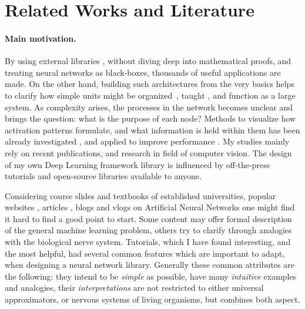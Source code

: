 \clearpage
\section{Related Works and Literature}

\paragraph{Main motivation.} By using external libraries \cite{TF, torch, caffe}, without diving deep into mathematical proofs, and treating neural networks as black-boxes, thousands of useful applications \cite{haykin2004comprehensive} are made. 
On the other hand, building such architectures from the very basics helps to clarify how simple units might be organized~\cite{milo2002network}, taught \cite{werbos1994roots}, and function \cite{hornik1989multilayer} as a large system. 
As complexity arises, the processes in the network becomes unclear and brings the question: what is the purpose of each node? 
Methods to visualize how activation patterns formulate, and what information is held within them has been already investigated \cite{yosinski2015understanding}, and applied to improve performance \cite{zeiler2014visualizing}. 
My studies mainly rely on recent publications, and research in field of computer vision. The design of my own Deep Learning framework library is influenced by off-the-press tutorials \cite{Goodfellow-et-al-2016-Book, deeplearningdotnet, nnsdl, stanfordlectures, gibiansky} and open-source libraries \cite{TF, torch, caffe} available to anyone.

Considering course slides \cite{stanfordlectures, oxfordlectures} and textbooks \cite{Goodfellow-et-al-2016-Book, werbos1994roots, bengio2009learning} of established universities, popular websites \cite{deeplearningdotnet, pedregosa2011scikit}, 
articles \cite{lecun2015deep}, blogs \cite{gibiansky, karpathyblog} and vlogs \cite{vlog1} on Artificial Neural Networks one might find it hard to find a good point to start. 
Some content may offer formal description of the general machine learning problem, others try to clarify through analogies with the biological nerve system.
Tutorials, which I have found interesting, and the most helpful, had several common features which are important to adapt, when designing a neural network library.
Generally these common attributes are the following: 
they intend to be \emph{simple} as possible, 
have many \emph{intuitive} examples and analogies,
their \emph{interpretations} are not restricted to either universal approximators, 
or nervous systems of living organisms, but combines both aspect.

